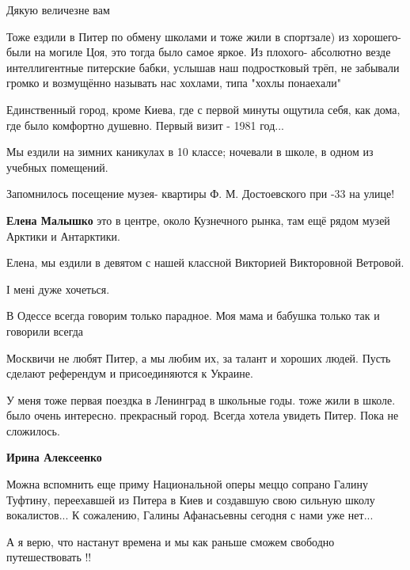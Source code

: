 \begin{itemize}
Дякую величезне вам


Тоже ездили в Питер по обмену школами и тоже жили в спортзале) из хорошего-были
на могиле Цоя, это тогда было самое яркое. Из плохого- абсолютно везде
интеллигентные питерские бабки, услышав наш подростковый трёп, не забывали
громко и возмущённо называть нас хохлами, типа "хохлы понаехали"


Единственный город, кроме Киева, где с первой минуты ощутила себя, как дома,
где было комфортно душевно. Первый визит - 1981 год...


Мы ездили на зимних каникулах в 10 классе; ночевали в школе, в одном из учебных помещений.

Запомнилось посещение музея- квартиры Ф. М. Достоевского при -33 на улице!

\begin{itemize} %
\textbf{Елена Малышко} это в центре, около Кузнечного рынка, там ещё рядом музей Арктики и Антарктики.

Елена, мы ездили в девятом с нашей классной Викторией Викторовной Ветровой.
\end{itemize} %

І мені дуже хочеться.

В Одессе всегда говорим только парадное. Моя мама и бабушка только так и говорили всегда

Москвичи не любят Питер, а мы любим их, за талант и хороших людей. Пусть сделают референдум и присоединяются к Украине.

У меня тоже первая поездка в Ленинград в школьные годы. тоже жили в школе. было очень интересно. прекрасный город.
Всегда хотела увидеть Питер. Пока не сложилось.

\textbf{Ирина Алексеенко} 

Можна вспомнить еще приму Национальной оперы меццо сопрано Галину Туфтину,
переехавшей из Питера в Киев и создавшую свою сильную школу вокалистов... К
сожалению, Галины Афанасьевны сегодня с нами уже нет...


А я верю, что настанут времена и мы как раньше сможем свободно путешествовать !!


\end{itemize}
